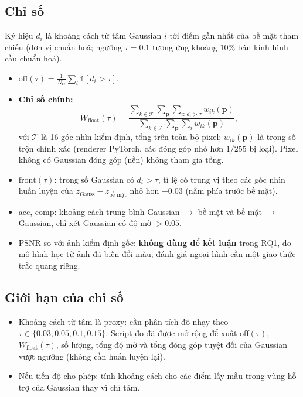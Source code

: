 \documentclass[11pt,a4paper]{article}
\begin{document}
\subsection{Chỉ số}
Ký hiệu $d_i$ là khoảng cách từ tâm Gaussian $i$ tới điểm gần nhất của bề mặt tham chiếu (đơn vị chuẩn hoá; ngưỡng $\tau=0.1$ tương ứng khoảng 10\% bán kính hình cầu chuẩn hoá).
\begin{itemize}
  \item $\text{off}(\tau)=\frac{1}{N_G}\sum_i \mathbb{1}[d_i>\tau]$.
  \item \textbf{Chỉ số chính:}
  \begin{equation}
  W_{\text{float}}(\tau) = \frac{\sum_{k\in\mathcal{T}}\sum_{\mathbf{p}}\sum_{i:\,d_i>\tau} w_{ik}(\mathbf{p})}{\sum_{k\in\mathcal{T}}\sum_{\mathbf{p}}\sum_{i} w_{ik}(\mathbf{p})},
  \end{equation}
  với $\mathcal{T}$ là 16 góc nhìn kiểm định, tổng trên toàn bộ pixel; $w_{ik}(\mathbf{p})$ là trọng số trộn chính xác (renderer PyTorch, các đóng góp nhỏ hơn $1/255$ bị loại). Pixel không có Gaussian đóng góp (nền) không tham gia tổng.
  \item $\text{front}(\tau)$: trong số Gaussian có $d_i>\tau$, tỉ lệ có trung vị theo các góc nhìn huấn luyện của $z_{\text{Gauss}}-z_{\text{bề mặt}}$ nhỏ hơn $-0.03$ (nằm phía trước bề mặt).
  \item acc, comp: khoảng cách trung bình Gaussian $\to$ bề mặt và bề mặt $\to$ Gaussian, chỉ xét Gaussian có độ mờ $>0.05$.
  \item PSNR so với ảnh kiểm định gốc: \textbf{không dùng để kết luận} trong RQ1, do mô hình học từ ảnh đã biến đổi màu; đánh giá ngoại hình cần một giao thức trắc quang riêng.
\end{itemize}

\subsection{Giới hạn của chỉ số}
\label{sec:metric-limits}
\begin{itemize}
  \item Khoảng cách từ tâm là proxy: cần phân tích độ nhạy theo $\tau\in\{0.03, 0.05, 0.1, 0.15\}$. Script đo đã được mở rộng để xuất $\text{off}(\tau)$, $W_{\text{float}}(\tau)$, số lượng, tổng độ mờ và tổng đóng góp tuyệt đối của Gaussian vượt ngưỡng (không cần huấn luyện lại).
  \item Nếu tiến độ cho phép: tính khoảng cách cho các điểm lấy mẫu trong vùng hỗ trợ của Gaussian thay vì chỉ tâm.
\end{itemize}
\end{document}
